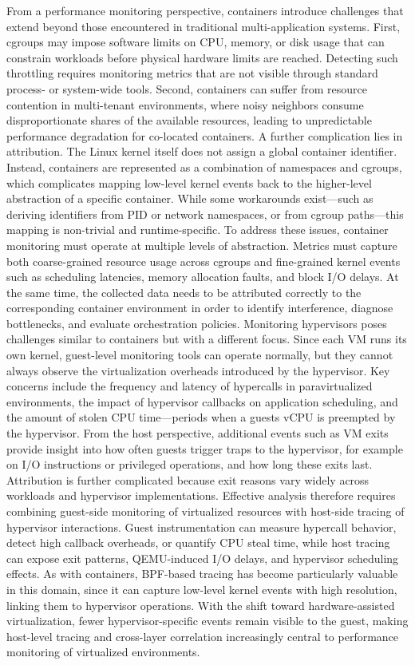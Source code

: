 From a performance monitoring perspective, containers introduce challenges that extend beyond those encountered in traditional multi-application systems. First, cgroups may impose software limits on CPU, memory, or disk usage that can constrain workloads before physical hardware limits are reached. Detecting such throttling requires monitoring metrics that are not visible through standard process- or system-wide tools. Second, containers can suffer from resource contention in multi-tenant environments, where noisy neighbors consume disproportionate shares of the available resources, leading to unpredictable performance degradation for co-located containers.
A further complication lies in attribution. The Linux kernel itself does not assign a global container identifier. Instead, containers are represented as a combination of namespaces and cgroups, which complicates mapping low-level kernel events back to the higher-level abstraction of a specific container. While some workarounds exist—such as deriving identifiers from PID or network namespaces, or from cgroup paths—this mapping is non-trivial and runtime-specific. To address these issues, container monitoring must operate at multiple levels of abstraction. Metrics must capture both coarse-grained resource usage across cgroups and fine-grained kernel events such as scheduling latencies, memory allocation faults, and block I/O delays. At the same time, the collected data needs to be attributed correctly to the corresponding container environment in order to identify interference, diagnose bottlenecks, and evaluate orchestration policies.
Monitoring hypervisors poses challenges similar to containers but with a different focus. Since each VM runs its own kernel, guest-level monitoring tools can operate normally, but they cannot always observe the virtualization overheads introduced by the hypervisor. Key concerns include the frequency and latency of hypercalls in paravirtualized environments, the impact of hypervisor callbacks on application scheduling, and the amount of stolen CPU time—periods when a guests vCPU is preempted by the hypervisor. From the host perspective, additional events such as VM exits provide insight into how often guests trigger traps to the hypervisor, for example on I/O instructions or privileged operations, and how long these exits last. Attribution is further complicated because exit reasons vary widely across workloads and hypervisor implementations.
Effective analysis therefore requires combining guest-side monitoring of virtualized resources with host-side tracing of hypervisor interactions. Guest instrumentation can measure hypercall behavior, detect high callback overheads, or quantify CPU steal time, while host tracing can expose exit patterns, QEMU-induced I/O delays, and hypervisor scheduling effects. As with containers, BPF-based tracing has become particularly valuable in this domain, since it can capture low-level kernel events with high resolution, linking them to hypervisor operations. With the shift toward hardware-assisted virtualization, fewer hypervisor-specific events remain visible to the guest, making host-level tracing and cross-layer correlation increasingly central to performance monitoring of virtualized environments.

